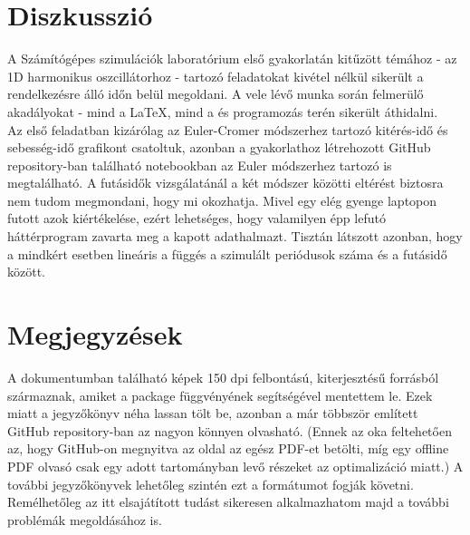 \begin{multicols}{2}
\section{Diszkusszió}
A Számítógépes szimulációk laboratórium első gyakorlatán kitűzött témához - az 1D harmonikus oszcillátorhoz - tartozó feladatokat kivétel nélkül sikerült a rendelkezésre álló időn belül megoldani. A vele lévő munka során felmerülő akadályokat - mind a \LaTeX, mind a  és  programozás terén sikerült áthidalni. \\
Az első feladatban kizárólag az Euler-Cromer módszerhez tartozó kitérés-idő és sebesség-idő grafikont csatoltuk, azonban a gyakorlathoz létrehozott GitHub repository-ban\cite{github} található notebookban az Euler módszerhez tartozó is megtalálható. A futásidők vizsgálatánál a két módszer közötti eltérést biztosra nem tudom megmondani, hogy mi okozhatja. Mivel egy elég gyenge laptopon futott azok kiértékelése, ezért lehetséges, hogy valamilyen épp lefutó háttérprogram zavarta meg a kapott adathalmazt. Tisztán látszott azonban, hogy a mindkért esetben lineáris a függés a szimulált periódusok száma és a futásidő között.


\section{Megjegyzések}
A dokumentumban található képek 150 dpi felbontású,  kiterjesztésű forrásból származnak, amiket a  package  függvényének segítségével mentettem le. Ezek miatt a jegyzőkönyv néha lassan tölt be, azonban a már többször említett GitHub repository-ban az nagyon könnyen olvasható. (Ennek az oka feltehetően az, hogy GitHub-on megnyitva az oldal az egész PDF-et betölti, míg egy offline PDF olvasó csak egy adott tartományban levő részeket az optimalizáció miatt.) A további jegyzőkönyvek lehetőleg szintén ezt a formátumot fogják követni. \\
Remélhetőleg az itt elsajátított tudást sikeresen alkalmazhatom majd a további problémák megoldásához is.

\end{multicols}
\hrulefill